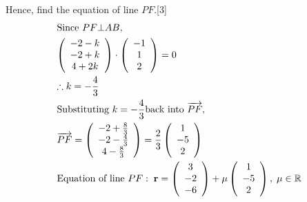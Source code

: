 \documentclass[12pt, a4 paper]{article}
\begin{document}
\begin{outline}[enumerate]
				\color{black}
				\2 Hence, find the equation of line $PF$.\hfill[3]
				\color{blue}
				\[\begin{gathered}
					{\text{Since }}PF \bot AB, \hfill \\
					\left( {\begin{array}{*{20}{c}}
						{ - 2 - k} \\
						{ - 2 + k} \\
						{4 + 2k}
						\end{array}} \right) \cdot \left( {\begin{array}{*{20}{c}}
						{ - 1} \\
						1 \\
						2
						\end{array}} \right) = 0 \hfill \\
					\therefore k =  - \frac{4}{3} \hfill \\
					{\text{Substituting }}k =  - \frac{4}{3}{\text{back into }}\overrightarrow {PF} , \hfill \\
					\overrightarrow {PF}  = \left( {\begin{array}{*{20}{c}}
						{ - 2 + \frac{8}{3}} \\
						{ - 2 - \frac{4}{3}} \\
						{4 - \frac{8}{3}}
						\end{array}} \right) = \frac{2}{3}\left( {\begin{array}{*{20}{c}}
						1 \\
						{ - 5} \\
						2
						\end{array}} \right) \hfill \\
					{\text{Equation of line }}PF:\;{\mathbf{r}} = \left( {\begin{array}{*{20}{c}}
						3 \\
						{ - 2} \\
						{ - 6}
						\end{array}} \right) + \mu \left( {\begin{array}{*{20}{c}}
						1 \\
						{ - 5} \\
						2
						\end{array}} \right),\;\mu  \in \mathbb{R} \hfill \\
					\end{gathered}\]



\end{outline}
\end{document}
